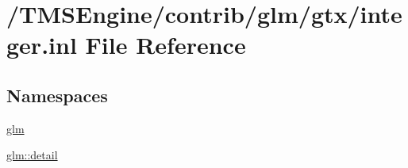 \hypertarget{gtx_2integer_8inl}{}\section{/\+T\+M\+S\+Engine/contrib/glm/gtx/integer.inl File Reference}
\label{gtx_2integer_8inl}
\subsection*{Namespaces}
\begin{DoxyCompactItemize}
\item 
 \hyperlink{namespaceglm}{glm}
\item 
 \hyperlink{namespaceglm_1_1detail}{glm\+::detail}
\end{DoxyCompactItemize}
